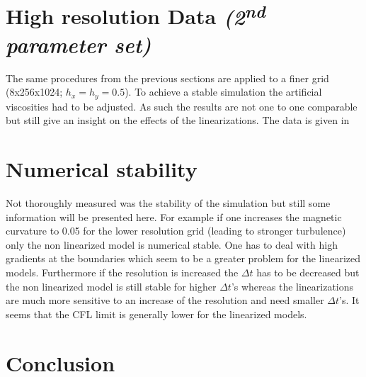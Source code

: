 \documentclass[master.tex]{subfiles}
\begin{document}
\section{High resolution Data \textit{(2\textsuperscript{nd} parameter set)}}
The same procedures from the previous sections are applied to a finer grid (8x256x1024; $h_x = h_y = 0.5$). To achieve a stable simulation the artificial viscosities had to be adjusted. As such the results are not one to one comparable but still give an insight on the effects of the linearizations. The data is given in 



\section{Numerical stability}
Not thoroughly measured was the stability of the simulation but still some information will be presented here. For example if one increases the magnetic curvature to 0.05 for the lower resolution grid (leading to stronger turbulence) only the non linearized model is numerical stable. One has to deal with high gradients at the boundaries which seem to be a greater problem for the linearized models. 
Furthermore if the resolution is increased the $\Delta t$ has to be decreased but the non linearized model is still stable for higher $\Delta t$'s whereas the linearizations are much more sensitive to an increase of the resolution and need smaller $\Delta t$'s. It seems that the \ac{CFL} limit is generally lower for the linearized models.

\section{Conclusion}
\end{document}
